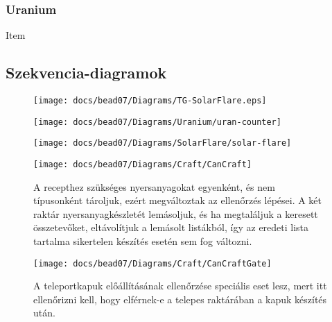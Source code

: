 \documentclass[../../projlab]{subfiles}
\begin{document}
\subsubsection{Uranium}
\begin{class-template-baseclass}
    Item
\end{class-template-baseclass}
\begin{class-template-attribute}
\end{class-template-attribute}

\subsection{Szekvencia-diagramok}


\begin{figure}[H] 
    \centering 
    \texttt{[image: docs/bead07/Diagrams/TG-SolarFlare.eps]} 
    \caption{} 
\end{figure}

\begin{figure}[H] 
    \centering 
    \texttt{[image: docs/bead07/Diagrams/Uranium/uran-counter]} 
    \caption{} 
\end{figure}

\begin{figure}[H] 
    \centering 
    \texttt{[image: docs/bead07/Diagrams/SolarFlare/solar-flare]} 
    \caption{} 
\end{figure}

\begin{figure}[H] 
    \centering 
    \texttt{[image: docs/bead07/Diagrams/Craft/CanCraft]} 
    \caption{A recepthez szükséges nyersanyagokat egyenként, és nem típusonként tároljuk, ezért megváltoztak az ellenőrzés lépései. A két raktár nyersanyagkészletét lemásoljuk, és ha megtaláljuk a keresett összetevőket, eltávolítjuk a lemásolt listákból, így az eredeti lista tartalma sikertelen készítés esetén sem fog változni. } 
\end{figure} 

\begin{figure}[H] 
    \centering 
    \texttt{[image: docs/bead07/Diagrams/Craft/CanCraftGate]} 
    \caption{A teleportkapuk előállításának ellenőrzése speciális eset lesz, mert itt ellenőrizni kell, hogy elférnek-e a telepes raktárában a kapuk készítés után.} 
\end{figure} 
\end{document}
